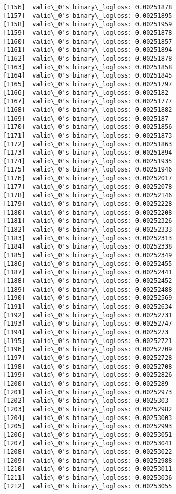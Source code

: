 \documentclass[11pt]{article}
\begin{document}
\begin{Verbatim}[commandchars=\\\{\}]
[1156]	valid\_0's binary\_logloss: 0.00251878
[1157]	valid\_0's binary\_logloss: 0.00251895
[1158]	valid\_0's binary\_logloss: 0.00251959
[1159]	valid\_0's binary\_logloss: 0.00251878
[1160]	valid\_0's binary\_logloss: 0.00251857
[1161]	valid\_0's binary\_logloss: 0.00251894
[1162]	valid\_0's binary\_logloss: 0.00251878
[1163]	valid\_0's binary\_logloss: 0.00251858
[1164]	valid\_0's binary\_logloss: 0.00251845
[1165]	valid\_0's binary\_logloss: 0.00251797
[1166]	valid\_0's binary\_logloss: 0.0025182
[1167]	valid\_0's binary\_logloss: 0.00251777
[1168]	valid\_0's binary\_logloss: 0.00251882
[1169]	valid\_0's binary\_logloss: 0.0025187
[1170]	valid\_0's binary\_logloss: 0.00251856
[1171]	valid\_0's binary\_logloss: 0.00251873
[1172]	valid\_0's binary\_logloss: 0.00251863
[1173]	valid\_0's binary\_logloss: 0.00251894
[1174]	valid\_0's binary\_logloss: 0.00251935
[1175]	valid\_0's binary\_logloss: 0.00251946
[1176]	valid\_0's binary\_logloss: 0.00252017
[1177]	valid\_0's binary\_logloss: 0.00252078
[1178]	valid\_0's binary\_logloss: 0.00252146
[1179]	valid\_0's binary\_logloss: 0.00252228
[1180]	valid\_0's binary\_logloss: 0.00252208
[1181]	valid\_0's binary\_logloss: 0.00252326
[1182]	valid\_0's binary\_logloss: 0.00252333
[1183]	valid\_0's binary\_logloss: 0.00252313
[1184]	valid\_0's binary\_logloss: 0.00252338
[1185]	valid\_0's binary\_logloss: 0.00252349
[1186]	valid\_0's binary\_logloss: 0.00252455
[1187]	valid\_0's binary\_logloss: 0.00252441
[1188]	valid\_0's binary\_logloss: 0.00252452
[1189]	valid\_0's binary\_logloss: 0.00252488
[1190]	valid\_0's binary\_logloss: 0.00252569
[1191]	valid\_0's binary\_logloss: 0.00252634
[1192]	valid\_0's binary\_logloss: 0.00252731
[1193]	valid\_0's binary\_logloss: 0.00252747
[1194]	valid\_0's binary\_logloss: 0.0025273
[1195]	valid\_0's binary\_logloss: 0.00252721
[1196]	valid\_0's binary\_logloss: 0.00252709
[1197]	valid\_0's binary\_logloss: 0.00252728
[1198]	valid\_0's binary\_logloss: 0.00252708
[1199]	valid\_0's binary\_logloss: 0.00252826
[1200]	valid\_0's binary\_logloss: 0.0025289
[1201]	valid\_0's binary\_logloss: 0.00252973
[1202]	valid\_0's binary\_logloss: 0.0025303
[1203]	valid\_0's binary\_logloss: 0.00252982
[1204]	valid\_0's binary\_logloss: 0.00253003
[1205]	valid\_0's binary\_logloss: 0.00252993
[1206]	valid\_0's binary\_logloss: 0.00253051
[1207]	valid\_0's binary\_logloss: 0.00253041
[1208]	valid\_0's binary\_logloss: 0.00253022
[1209]	valid\_0's binary\_logloss: 0.00252988
[1210]	valid\_0's binary\_logloss: 0.00253011
[1211]	valid\_0's binary\_logloss: 0.00253036
[1212]	valid\_0's binary\_logloss: 0.00253055

\end{Verbatim}
\end{document}
